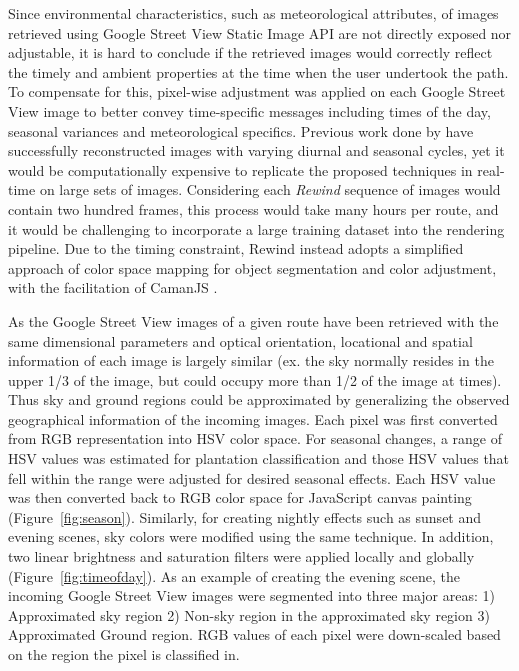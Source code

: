 \documentclass{sigchi}
\begin{document}
Since environmental characteristics, such as meteorological attributes, of images retrieved using Google Street View Static Image API are not directly exposed nor adjustable, it is hard to conclude if the retrieved images would correctly reflect the timely and ambient properties at the time when the user undertook the path. To compensate for this, pixel-wise adjustment was applied on each Google Street View image to better convey time-specific messages including times of the day, seasonal variances and meteorological specifics. Previous work done by \cite{laffont2014transient,shih2013data} have successfully reconstructed images with varying diurnal and seasonal cycles, yet it would be computationally expensive to replicate the proposed techniques in real-time on large sets of images. Considering each \textit{Rewind} sequence of images would contain two hundred frames, this process would take many hours per route, and it would be challenging to incorporate a large training dataset into the rendering pipeline. Due to the timing constraint, Rewind instead adopts a simplified approach of color space mapping for object segmentation and color adjustment, with the facilitation of CamanJS \cite{caman}.

As the Google Street View images of a given route have been retrieved with the same dimensional parameters and optical orientation, locational and spatial information of each image is largely similar (ex. the sky normally resides in the upper 1/3 of the image, but could occupy more than 1/2 of the image at times). Thus sky and ground regions could be approximated by generalizing the observed geographical information of the incoming images. Each pixel was first converted from RGB representation into HSV color space. For seasonal changes, a range of HSV values was estimated for plantation classification and those HSV values that fell within the range were adjusted for desired seasonal effects. Each HSV value was then converted back to RGB color space for JavaScript canvas painting (Figure~\ref{fig:season}). Similarly, for creating nightly effects such as sunset and evening scenes, sky colors were modified using the same technique. In addition, two linear brightness and saturation filters were applied locally and globally (Figure~\ref{fig:timeofday}). As an example of creating the evening scene, the incoming Google Street View images were segmented into three major areas: 1) Approximated sky region 2) Non-sky region in the approximated sky region 3) Approximated Ground region. RGB values of each pixel were down-scaled based on the region the pixel is classified in. 
\end{document}

